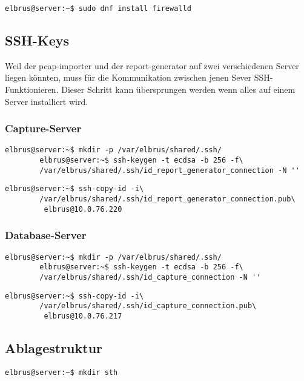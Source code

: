 \documentclass{article}
\begin{document}
	\begin{lstlisting}[caption={Installieren von dem 'firewalld' Service.}]
		elbrus@server:~$ sudo dnf install firewalld
	\end{lstlisting}

	\newpage
	\subsection{SSH-Keys}
	Weil der pcap-importer und der report-generator auf zwei verschiedenen Server liegen könnten, muss für die Kommunikation zwischen jenen Sever SSH-Funktionieren.
	\newline\newline
	Dieser Schritt kann übersprungen werden wenn alles auf einem Server installiert wird.
	
	\subsubsection{Capture-Server}
	\begin{lstlisting}[caption={Anlegen der SSH-Keys}]
		elbrus@server:~$ mkdir -p /var/elbrus/shared/.ssh/
		elbrus@server:~$ ssh-keygen -t ecdsa -b 256 -f\
		/var/elbrus/shared/.ssh/id_report_generator_connection -N ''
	\end{lstlisting}

	\begin{lstlisting}[caption={Übertragen der SSH-Keys auf den Database-Server.}]
		elbrus@server:~$ ssh-copy-id -i\
		/var/elbrus/shared/.ssh/id_report_generator_connection.pub\
		 elbrus@10.0.76.220
	\end{lstlisting}

	\subsubsection{Database-Server}
	\begin{lstlisting}[caption={Anlegen der SSH-Keys}]
		elbrus@server:~$ mkdir -p /var/elbrus/shared/.ssh/
		elbrus@server:~$ ssh-keygen -t ecdsa -b 256 -f\
		/var/elbrus/shared/.ssh/id_capture_connection -N ''
	\end{lstlisting}
	
	\begin{lstlisting}[caption={Übertragen der SSH-Keys auf den Capture-Server.}]
		elbrus@server:~$ ssh-copy-id -i\
		/var/elbrus/shared/.ssh/id_capture_connection.pub\
		 elbrus@10.0.76.217
	\end{lstlisting}
	
	\subsection{Ablagestruktur}
	\lstset{style=commands}
	\begin{lstlisting}[caption={Anlegen der Ordnerstruktur.}]
		elbrus@server:~$ mkdir sth
	\end{lstlisting}
\end{document}
